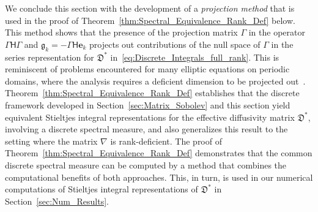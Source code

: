 \documentclass[english,12pt,jmp,graphicx]{revtex4-1}
\newcommand{\vecg}{\mathfrak{g}}
\newcommand{\vece}{\boldsymbol{e}}
\newcommand{\thmref}[1]{Theorem~\ref{#1}}
\newcommand{\secref}[1]{Section~\ref{#1}}
\newcommand{\bcdot}{\mbox{\boldmath${\cdot}$}}
\newcommand{\Sg}{\mathfrak{S}}
\newcommand{\Ag}{\mathfrak{A}}
\newcommand{\Dg}{\mathfrak{D}}
\newcommand{\Real}{\mbox{Re}\,}
\newcommand{\Imag}{\mbox{Im}\,}
\newcommand{\Hm}{\mathsf{H}}
\newcommand{\Am}{\mathsf{A}}
\newcommand{\Qm}{\mathsf{Q}}
\newcommand{\Qc}{\mathcal{Q}}
\begin{document}




We conclude this section with the development of a \emph{projection method}
that is used in the proof of \thmref{thm:Spectral_Equivalence_Rank_Def}
below. This method shows that the presence of the projection matrix
$\Gamma$ in the operator $\Gamma\Hm\Gamma$ and
$\vecg_k=-\Gamma\Hm\vece_k$ projects out contributions of the null space
of $\Gamma$ in the series representation for $\Dg^*$
in~\eqref{eq:Discrete_Integrals_full_rank}. This is reminiscent of
problems encountered for many elliptic equations on periodic domains,
where the analysis requires a deficient dimension to be
projected out~\cite{Bensoussan:Book:1978}. 
\thmref{thm:Spectral_Equivalence_Rank_Def}  establishes that
the discrete framework developed in \secref{sec:Matrix_Sobolev} and
this section yield equivalent Stieltjes integral representations for
the effective diffusivity matrix $\Dg^*$, involving a discrete
spectral measure, and also generalizes this result to the setting
where the matrix $\nabla$ is rank-deficient. The proof of 
\thmref{thm:Spectral_Equivalence_Rank_Def} demonstrates that the
common discrete spectral measure can be computed by a method that 
combines the computational benefits of both approaches. This, in turn,
is used in our numerical computations of Stieltjes integral
representations of $\Dg^*$ in \secref{sec:Num_Results}.
\end{document}
